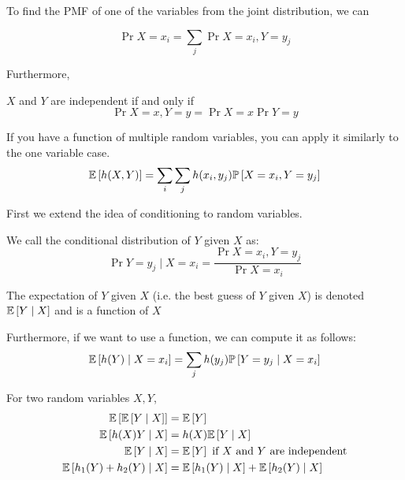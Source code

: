 To find the PMF of one of the variables from the joint distribution, we can
\begin{note}
    \[ \Pr{X = x_i} = \sum_j \Pr{X = x_i, Y = y_j} \]
\end{note}

Furthermore,
\begin{theorem} 
    $X$ and $Y$ are independent if and only if
    \[ \Pr{X = x, Y = y} = \Pr{X = x} \Pr{Y = y} \]
\end{theorem}

If you have a function of multiple random variables, you can apply it similarly
to the one variable case.
\[ \mathbb{E}\left[ h(X, Y) \right] = \sum_{i} \sum_{j} h(x_i, y_j) \mathbb{P}\left[ X = x_i, Y = y_j \right] \]

First we extend the idea of conditioning to random variables.

\begin{definition}
    We call the conditional distribution of $Y$ given $X$ as:
    \[ \Pr{Y = y_j \mid X = x_i} = \frac{\Pr{X = x_i, Y = y_j}}{\Pr{X = x_i}} \]
\end{definition}

\begin{definition}
    The expectation of $Y$ given $X$ (i.e. the best guess of $Y$ given $X$)
    is denoted $\mathbb{E}\left[ Y \mid X \right]$ and is a function of $X$
\end{definition}

Furthermore, if we want to use a function, we can compute it as follows:
\[ \mathbb{E}\left[ h(Y) \mid X = x_i \right] = \sum_j h(y_j) \mathbb{P}\left[ Y = y_j \mid X = x_i \right] \]

\begin{theorem}
    For two random variables $X, Y$,
    \begin{align*}
        \mathbb{E}\left[ \mathbb{E}\left[ Y \mid X \right] \right] &= \mathbb{E}\left[ Y \right] \\
        \mathbb{E}\left[ h(X)Y \mid X \right] &= h(X) \mathbb{E}\left[ Y \mid X \right] \\
        \mathbb{E}\left[ Y \mid X \right] &= \mathbb{E}\left[ Y \right] \text{ if $X$ and $Y$ are independent} \\
        \mathbb{E}\left[ h_1(Y) + h_2(Y) \mid X \right] &= \mathbb{E}\left[ h_1(Y) \mid X \right] + \mathbb{E}\left[ h_2(Y) \mid X \right]
    \end{align*}
\end{theorem}
